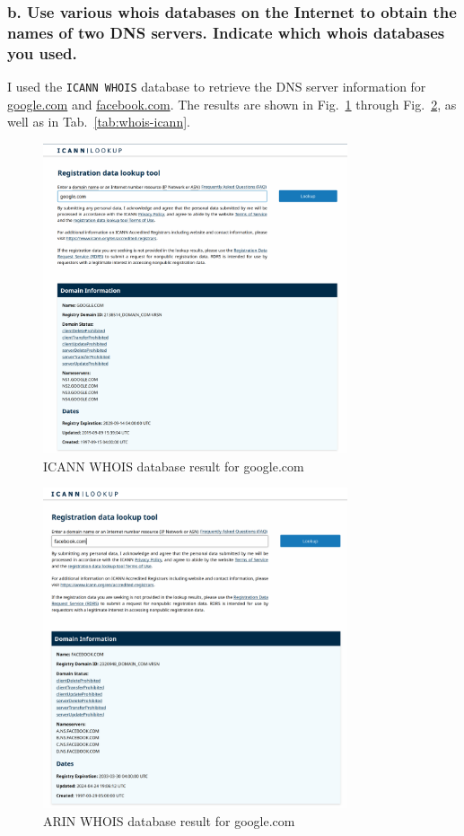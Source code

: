 \documentclass{cshwk}
\begin{document}
\subsubsection*{b. Use various whois databases on the Internet to obtain the names of two DNS servers. Indicate which whois databases you used.}

I used the \texttt{ICANN WHOIS} database to retrieve the DNS server information for \href{https://www.google.com}{google.com} and \href{https://www.facebook.com}{facebook.com}. The results are shown in Fig.~\ref{fig:whois-icann-google} through Fig.~\ref{fig:whois-icann-facebook}, as well as in Tab.~\ref{tab:whois-icann}.


\begin{figure}[htbp]
    \centering
    \includegraphics[width=0.8\textwidth]{hw2-1-1.png}
    \caption{ICANN WHOIS database result for google.com}
    \label{fig:whois-icann-google}
\end{figure}

\begin{figure}[htbp]
    \centering
    \includegraphics[width=0.8\textwidth]{hw2-1-2.png}
    \caption{ARIN WHOIS database result for google.com}
    \label{fig:whois-icann-facebook}
\end{figure}
\end{document}

